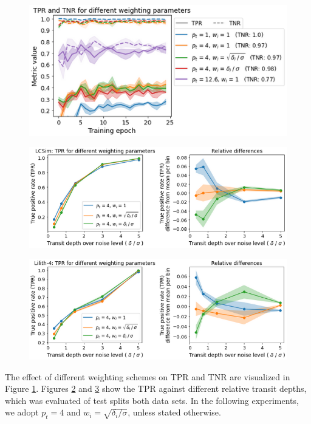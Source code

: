 \begin{figure}
    \centering
    \includegraphics[width=0.5\linewidth]{Experiments/Figures/Hybrid/weighting_valid_lcsim.png}
    \caption{}
    \label{fig:hybrid-weighting}
\end{figure}

\begin{figure}
    \centering
    \includegraphics[width=0.65\linewidth]{Experiments/Figures/Hybrid/weighting_lcsim.png}
    \caption{}
    \label{fig:hybrid-lcsim_weighting}
\end{figure}

\begin{figure}
    \centering
    \includegraphics[width=0.65\linewidth]{Experiments/Figures/Hybrid/weighting_lilith.png}
    \caption{}
    \label{fig:hybrid-lilith_weighting}
\end{figure}

The effect of different weighting schemes on TPR and TNR are visualized in Figure \ref{fig:hybrid-weighting}. Figures \ref{fig:hybrid-lcsim_weighting} and \ref{fig:hybrid-lilith_weighting} show the TPR against different relative transit depths, which was evaluated of test splits both data sets.
 In the following experiments, we adopt $p_t=4$ and $w_i = \sqrt{\delta_i / \sigma}$, unless stated otherwise.

